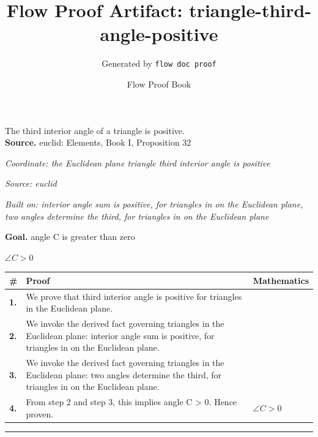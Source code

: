 \documentclass[11pt]{article}
\title{Flow Proof Artifact: triangle-third-angle-positive}
\author{Generated by \texttt{flow doc proof}}
\date{Flow Proof Book}
\theoremstyle{definition}
\begin{document}
\maketitle
The third interior angle of a triangle is positive.\\[0.5em]
\textbf{Source.} euclid: Elements, Book I, Proposition 32\\[0.5em]
\bigskip
{}\par
\smallskip\noindent\textit{Coordinate: the Euclidean plane \cdot triangle \cdot third interior angle is positive}\par
\smallskip\noindent\textit{Source: euclid}\par
\smallskip\noindent\textit{Built on: interior angle sum is positive, for triangles in on the Euclidean plane, two angles determine the third, for triangles in on the Euclidean plane}\par
\medskip
\noindent\textbf{Goal.} angle C is greater than zero\par
\noindent$\displaystyle \angle C > 0$\par
\medskip
\noindent
\begin{tabular}{@{} >{\raggedright\arraybackslash}p{} >{\raggedright\arraybackslash}p{} >{\raggedleft\arraybackslash}p{} @{}}
\textbf{\#} & \textbf{Proof} & \textbf{Mathematics} \\
\midrule
\textbf{1.} & We prove that third interior angle is positive for triangles in the Euclidean plane. & \\[0.45em]
\textbf{2.} & We invoke the derived fact governing triangles in the Euclidean plane: interior angle sum is positive, for triangles in on the Euclidean plane. & \\[0.45em]
\textbf{3.} & We invoke the derived fact governing triangles in the Euclidean plane: two angles determine the third, for triangles in on the Euclidean plane. & \\[0.45em]
\textbf{4.} & From step 2 and step 3, this implies angle C > 0. Hence proven. & $\displaystyle \angle C > 0$ \\[0.45em]
\bottomrule
\end{tabular}
\label{thm:Geometry-triangle-third_interior_angle_is_positive}
\par\medskip\hrule
\end{document}
